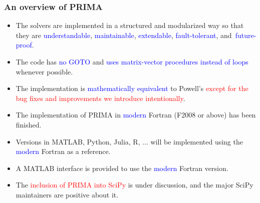 \documentclass[slidestop,mathserif,xcolor=dvipsnames]{beamer}
\newcommand{\blue}[1]{\textcolor{blue}{#1}}
\newcommand{\red}[1]{\textcolor{red}{#1}}
\begin{document}
\begin{frame}
    \frametitle{An overview of PRIMA}
\begin{itemize}
    \item The solvers are implemented in a structured and modularized way so that they are
        \blue{understandable}, \blue{maintainable},
        \blue{extendable},  \blue{fault-tolerant}, and~\mbox{\blue{future-proof}}.
    \vspace{1ex}
\item The code has \blue{no GOTO} and \blue{uses matrix-vector procedures instead of loops} whenever possible.
    \vspace{1ex}
\item The implementation is \blue{mathematically equivalent} to Powell's \red{except for the bug
    fixes and improvements we introduce intentionally}.
    \vspace{1ex}
\item The implementation of PRIMA in \blue{modern} Fortran (F2008 or above) has been finished.
    \vspace{1ex}
\item Versions in MATLAB, Python, Julia, R, ... will be implemented using the \blue{modern} Fortran as a reference.
    \vspace{1ex}
\item A MATLAB interface is provided to use the \blue{modern} Fortran version.
    \vspace{1ex}
\item The \red{inclusion of PRIMA into SciPy} is under discussion, and the major SciPy maintainers are
    positive about it.
\end{itemize}
\end{frame}
\end{document}
